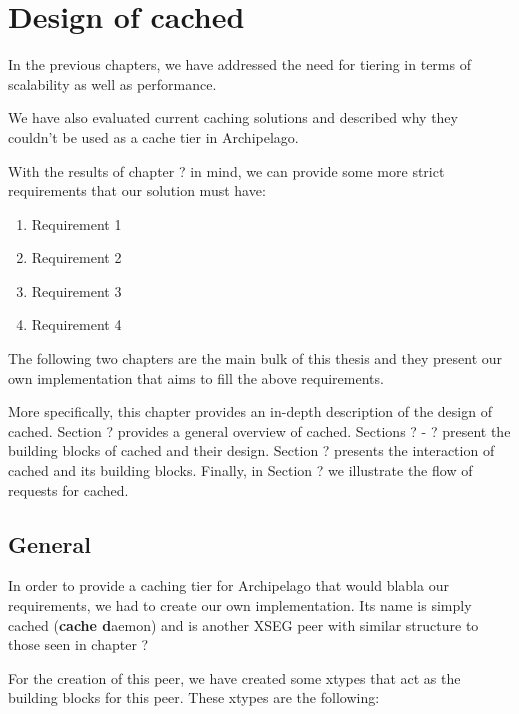 \chapter{Design of cached}\label{ch:cached-design}

In the previous chapters, we have addressed the need for tiering in terms of
scalability as well as performance. %

We have also evaluated current caching solutions and described why they couldn't 
be used as a cache tier in Archipelago. %

With the results of chapter ? in mind, we can provide some more strict 
requirements that our solution must have:

\begin{enumerate}
	\item Requirement 1
	\item Requirement 2
	\item Requirement 3
	\item Requirement 4
\end{enumerate}
The following two chapters are the main bulk of this thesis and they present our 
own implementation that aims to fill the above requirements.

More specifically, this chapter provides an in-depth description of the design 
of cached.  Section ?  provides a general overview of cached. Sections ? - ?  
present the building blocks of cached and their design. Section ? presents the 
interaction of cached and its building blocks. Finally, in Section ? we 
illustrate the flow of requests for cached.

\section{General}

In order to provide a caching tier for Archipelago that would blabla our 
requirements, we had to create our own implementation. Its name is simply cached 
(\textbf{cache d}aemon) and is another XSEG peer with similar structure to those 
seen in chapter ? %

For the creation of this peer, we have created some xtypes
that act as the building blocks for this peer. These xtypes are the following:

\begin{comment}
More specifically, cached consists of the cache provided by xcache aasfs as safa
asfasfnd a
pre-allocated number of objects. An object is divided in buckets and its size,
as well as bucket size, are defined by the user.

The fact that objects are pre-allocated means two things:

1) We don't need to care about memory fragmentation and system call overhead
2) We cannot index single buckets. <FILLME>
\end{comment}

